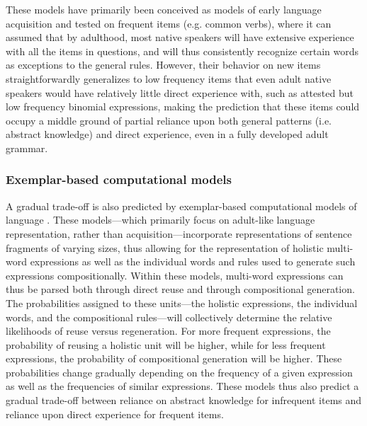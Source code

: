 \documentclass[authoryear]{elsarticle}
\begin{document}
These models have primarily been conceived as models of early language acquisition and tested on frequent items (e.g. common verbs), where it can assumed that by adulthood, most native speakers will have extensive experience with all the items in questions, and will thus consistently recognize certain words as exceptions to the general rules. However, their behavior on new items straightforwardly generalizes to low frequency items that even adult native speakers would have relatively little direct experience with, such as attested but low frequency binomial expressions, making the prediction that these items could occupy a middle ground of partial reliance upon both general patterns (i.e. abstract knowledge) and direct experience, even in a fully developed adult grammar.


\subsubsection{Exemplar-based computational models}
A gradual trade-off is also predicted by exemplar-based computational models of language \citep[e.g.][]{Bod:1998tx,Bod:2003uw, Bod:2008uc, Johnson:2007wl, Demberg:2010tf, ODonnell:2011vh}. These models---which primarily focus on adult-like language representation, rather than acquisition---incorporate representations of sentence fragments of varying sizes, thus allowing for the representation of holistic multi-word expressions as well as the individual words and rules used to generate such expressions compositionally. Within these models, multi-word expressions can thus be parsed both through direct reuse and through compositional generation. The probabilities assigned to these units---the holistic expressions, the individual words, and the compositional rules---will collectively determine the relative likelihoods of reuse versus regeneration. For more frequent expressions, the probability of reusing a holistic unit will be higher, while for less frequent expressions, the probability of compositional generation will be higher. These probabilities change gradually depending on the frequency of a given expression as well as the frequencies of similar expressions. These models thus also predict a gradual trade-off between reliance on abstract knowledge for infrequent items and reliance upon direct experience for frequent items.
\end{document}

